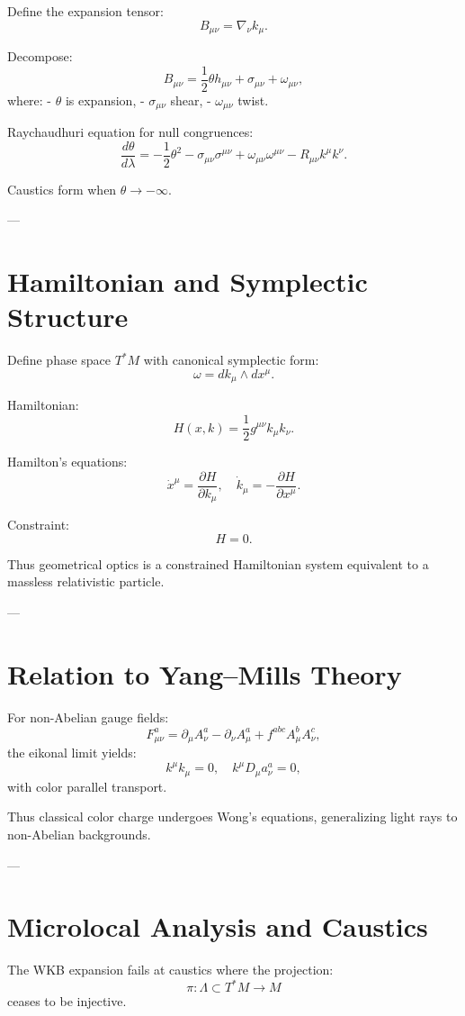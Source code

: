 \documentclass[12pt]{article}
\begin{document}
Define the expansion tensor:
\[
B_{\mu\nu} = \nabla_\nu k_\mu.
\]

Decompose:
\[
B_{\mu\nu} = \frac{1}{2}\theta h_{\mu\nu} + \sigma_{\mu\nu} + \omega_{\mu\nu},
\]
where:
- $\theta$ is expansion,
- $\sigma_{\mu\nu}$ shear,
- $\omega_{\mu\nu}$ twist.

Raychaudhuri equation for null congruences:
\[
\frac{d\theta}{d\lambda}
= -\frac{1}{2}\theta^2 - \sigma_{\mu\nu}\sigma^{\mu\nu}
+ \omega_{\mu\nu}\omega^{\mu\nu} - R_{\mu\nu}k^\mu k^\nu.
\]

Caustics form when $\theta \to -\infty$.

---

\section{Hamiltonian and Symplectic Structure}

Define phase space $T^*M$ with canonical symplectic form:
\[
\omega = dk_\mu \wedge dx^\mu.
\]

Hamiltonian:
\[
H(x,k) = \frac{1}{2} g^{\mu\nu} k_\mu k_\nu.
\]

Hamilton’s equations:
\[
\dot{x}^\mu = \frac{\partial H}{\partial k_\mu}, \quad
\dot{k}_\mu = -\frac{\partial H}{\partial x^\mu}.
\]

Constraint:
\[
H = 0.
\]

Thus geometrical optics is a constrained Hamiltonian system equivalent to a massless relativistic particle.

---

\section{Relation to Yang--Mills Theory}

For non-Abelian gauge fields:
\[
F^a_{\mu\nu} = \partial_\mu A^a_\nu - \partial_\nu A^a_\mu + f^{abc} A^b_\mu A^c_\nu,
\]
the eikonal limit yields:
\[
k^\mu k_\mu = 0,
\quad
k^\mu D_\mu a^a_\nu = 0,
\]
with color parallel transport.

Thus classical color charge undergoes Wong’s equations, generalizing light rays to non-Abelian backgrounds.

---

\section{Microlocal Analysis and Caustics}

The WKB expansion fails at caustics where the projection:
\[
\pi : \Lambda \subset T^*M \to M
\]
ceases to be injective.
\end{document}
